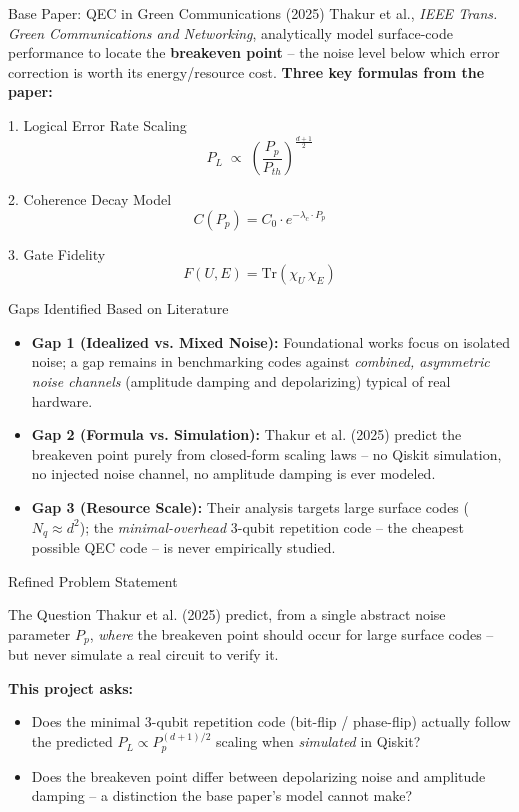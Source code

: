 \documentclass[aspectratio=169]{beamer}
\begin{document}
\begin{frame}{Base Paper: QEC in Green Communications (2025)}
\footnotesize
Thakur et al., \textit{IEEE Trans. Green Communications and Networking}, analytically model surface-code performance to locate the \textbf{breakeven point} -- the noise level below which error correction is worth its energy/resource cost.
\vspace{0.3cm}
\textbf{Three key formulas from the paper:}
\begin{block}{1. Logical Error Rate Scaling}
\[
P_L \;\propto\; \left(\frac{P_p}{P_{th}}\right)^{\frac{d+1}{2}}
\]
\end{block}
\begin{block}{2. Coherence Decay Model}
\[
C(P_p) = C_0 \cdot e^{-\lambda_c \cdot P_p}
\]
\end{block}
\begin{block}{3. Gate Fidelity}
\[
F(U,E) = \mathrm{Tr}(\chi_U \, \chi_E)
\]
\end{block}
\end{frame}
\begin{frame}{Gaps Identified Based on Literature}
\begin{itemize}
    \item \textbf{Gap 1 (Idealized vs. Mixed Noise):} Foundational works focus on isolated noise; a gap remains in benchmarking codes against \textit{combined, asymmetric noise channels} (amplitude damping and depolarizing) typical of real hardware.
    \item \textbf{Gap 2 (Formula vs. Simulation):} Thakur et al. (2025) predict the breakeven point purely from closed-form scaling laws -- no Qiskit simulation, no injected noise channel, no amplitude damping is ever modeled.
    \item \textbf{Gap 3 (Resource Scale):} Their analysis targets large surface codes ($N_q \approx d^2$); the \textit{minimal-overhead} 3-qubit repetition code -- the cheapest possible QEC code -- is never empirically studied.
\end{itemize}
\end{frame}
\begin{frame}{Refined Problem Statement}
\begin{alertblock}{The Question}
Thakur et al. (2025) predict, from a single abstract noise parameter $P_p$, \emph{where} the breakeven point should occur for large surface codes -- but never simulate a real circuit to verify it.
\end{alertblock}
\vspace{0.3cm}
\textbf{This project asks:}
\begin{itemize}
    \item Does the minimal 3-qubit repetition code (bit-flip / phase-flip) actually follow the predicted $P_L \propto P_p^{(d+1)/2}$ scaling when \emph{simulated} in Qiskit?
    \item Does the breakeven point differ between depolarizing noise and amplitude damping -- a distinction the base paper's model cannot make?
\end{itemize}
\end{frame}
\end{document}
